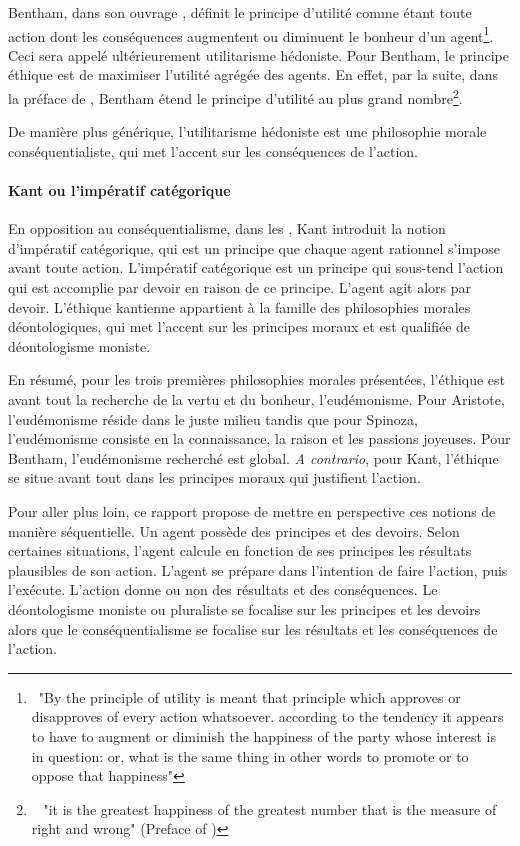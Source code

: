 Bentham, dans son ouvrage , définit le principe d'utilité comme étant toute action dont les conséquences augmentent ou diminuent le bonheur d'un agent\footnote{~"By the principle of utility is meant that
principle which approves or disapproves of every action whatsoever.
according to the tendency it appears to have to augment or diminish the
happiness of the party whose interest is in question: or, what is the same
thing in other words to promote or to oppose that happiness"}. Ceci sera appelé ultérieurement utilitarisme hédoniste. Pour Bentham, le principe éthique est de maximiser l'utilité agrégée des agents. En effet, par la suite, dans la préface de , Bentham étend le principe d'utilité au plus grand nombre\footnote{~
"it is the greatest happiness of the greatest number that is the measure of right and wrong" (Preface of )}.

De manière plus générique, l'utilitarisme hédoniste est une philosophie morale conséquentialiste, qui met l'accent sur les conséquences de l'action.

\paragraph{Kant ou l'impératif catégorique}


En opposition au conséquentialisme, dans les , Kant introduit la notion d'impératif catégorique, qui est un principe que chaque agent rationnel s'impose avant toute action. L'impératif catégorique est un principe qui sous-tend l'action qui est accomplie par devoir en raison de ce principe. L'agent agit alors par devoir. L'éthique kantienne appartient à la famille des philosophies morales déontologiques, qui met l'accent sur les principes moraux et est qualifiée de déontologisme moniste.

En résumé, pour les trois premières philosophies morales présentées, l'éthique est avant tout la recherche de la vertu et du bonheur, l'eudémonisme. Pour Aristote, l'eudémonisme réside dans le juste milieu tandis que pour Spinoza, l'eudémonisme consiste en la connaissance, la raison et les passions joyeuses. Pour Bentham, l'eudémonisme recherché est global. \textit{A contrario}, pour Kant, l'éthique se situe avant tout dans les principes moraux qui justifient l'action.


Pour aller plus loin, ce rapport propose de mettre en perspective ces notions de manière séquentielle. Un agent possède des principes et des devoirs. Selon certaines situations, l'agent calcule en fonction de ses principes les résultats plausibles de son action. L'agent se prépare dans l'intention de faire l'action, puis l'exécute. L'action donne ou non des résultats et des conséquences. Le déontologisme moniste ou pluraliste se focalise sur les principes et les devoirs alors que le conséquentialisme se focalise sur les résultats et les conséquences de l'action.

